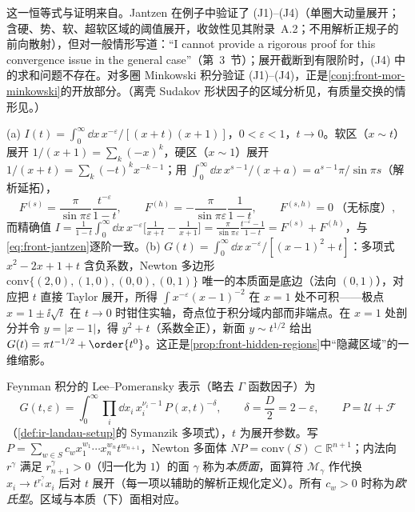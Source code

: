 这一恒等式与证明来自\cite[第~3~节]{Jantzen2011}。Jantzen 在例子中验证了 (J1)--(J4)（单圈大动量展开；含硬、势、软、超软区域的阈值展开，收敛性见其附录~A.2；不用解析正规子的前向散射），但对一般情形写道：“I cannot provide a rigorous proof for this convergence issue in the general case”（第~3~节）；展开截断到有限阶时，(J4) 中的求和问题不存在。对多圈 Minkowski 积分验证 (J1)--(J4)，正是\cref{conj:front-mor-minkowski}的开放部分。（离壳 Sudakov 形状因子的区域分析见\cite[第~2.2~节]{BecherBroggioFerroglia2015}，有质量交换的情形见\cite[第~6~节]{Jantzen2011}。）

\begin{example}[两个一维玩具模型]\label{ex:front-regions-toys}
(a) $I(t)=\int_0^\infty\dd x\,x^{-\varepsilon}/[(x+t)(x+1)]$，$0<\varepsilon<1$，$t\to0$。软区（$x\sim t$）展开 $1/(x+1)=\sum_k(-x)^k$，硬区（$x\sim1$）展开 $1/(x+t)=\sum_k(-t)^kx^{-k-1}$；用 $\int_0^\infty\dd x\,x^{s-1}/(x+a)=a^{s-1}\pi/\sin\pi s$（解析延拓），
\begin{equation*}
F^{(s)}=\frac{\pi}{\sin\pi\varepsilon}\frac{t^{-\varepsilon}}{1-t},\qquad F^{(h)}=-\frac{\pi}{\sin\pi\varepsilon}\frac{1}{1-t},\qquad F^{(s,h)}=0\ \text{（无标度）},
\end{equation*}
而精确值 $I=\frac{1}{1-t}\int_0^\infty\dd x\,x^{-\varepsilon}\bigl[\frac1{x+t}-\frac1{x+1}\bigr]=\frac{\pi}{\sin\pi\varepsilon}\frac{t^{-\varepsilon}-1}{1-t}=F^{(s)}+F^{(h)}$，与\cref{eq:front-jantzen}逐阶一致。(b) $G(t)=\int_0^\infty\dd x\,x^{-\varepsilon}/[(x-1)^2+t]$：多项式 $x^2-2x+1+t$ 含负系数，Newton 多边形 $\mathrm{conv}\{(2,0),(1,0),(0,0),(0,1)\}$ 唯一的本质面是底边（法向 $(0,1)$），对应把 $t$ 直接 Taylor 展开，所得 $\int x^{-\varepsilon}(x-1)^{-2}$ 在 $x=1$ 处不可积——极点 $x=1\pm\ii\sqrt t$ 在 $t\to0$ 时钳住实轴，奇点位于积分域内部而非端点。在 $x=1$ 处剖分并令 $y=|x-1|$，得 $y^2+t$（系数全正），新面 $y\sim t^{1/2}$ 给出 $G(t)=\pi t^{-1/2}+\order{t^0}$。这正是\cref{prop:front-hidden-regions}中“隐藏区域”的一维缩影。
\end{example}

\begin{definition}\label{def:front-facets}
Feynman 积分的 Lee--Pomeransky 表示（略去 $\Gamma$ 函数因子）为
\begin{equation*}
G(t,\varepsilon)=\int_0^\infty\prod_i\dd x_i\,x_i^{\nu_i-1}\,P(x,t)^{-\delta},\qquad\delta=\frac D2=2-\varepsilon,\qquad P=\mathcal U+\mathcal F
\end{equation*}
（\cref{def:ir-landau-setup}的 Symanzik 多项式），$t$ 为展开参数。写 $P=\sum_{w\in S}c_wx_1^{w_1}\cdots x_n^{w_n}t^{w_{n+1}}$，Newton 多面体 $NP=\mathrm{conv}(S)\subset\mathbb R^{n+1}$；内法向 $r^\gamma$ 满足 $r^\gamma_{n+1}>0$（归一化为 $1$）的面 $\gamma$ 称为\emph{本质面}，面算符 $\mathcal M_\gamma$ 作代换 $x_i\to t^{r^\gamma_i}x_i$ 后对 $t$ 展开（每一项以辅助的解析正规化定义）。所有 $c_w>0$ 时称为\emph{欧氏型}。区域与本质（下）面相对应。
\end{definition}

